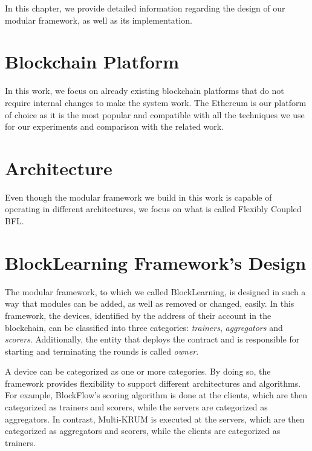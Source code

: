 In this chapter, we provide detailed information regarding the design of our modular framework, as well as its implementation.

\section{Blockchain Platform}

In this work, we focus on already existing blockchain platforms that do not require internal changes to make the system work. The Ethereum is our platform of choice as it is the most popular and compatible with all the techniques we use for our experiments and comparison with the related work.

\section{Architecture}

Even though the modular framework we build in this work is capable of operating in different architectures, we focus on what is called Flexibly Coupled BFL.

\section{BlockLearning Framework's Design}\label{framework:design}

The modular framework, to which we called BlockLearning, is designed in such a way that modules can be added, as well as removed or changed, easily. In this framework, the devices, identified by the address of their account in the blockchain, can be classified into three categories: \textit{trainers}, \textit{aggregators} and \textit{scorers}. Additionally, the entity that deploys the contract and is responsible for starting and terminating the rounds is called \textit{owner}.

A device can be categorized as one or more categories. By doing so, the framework provides flexibility to support different architectures and algorithms. For example, BlockFlow's scoring algorithm is done at the clients, which are then categorized as trainers and scorers, while the servers are categorized as aggregators. In contrast, Multi-KRUM is executed at the servers, which are then categorized as aggregators and scorers, while the clients are categorized as trainers.



